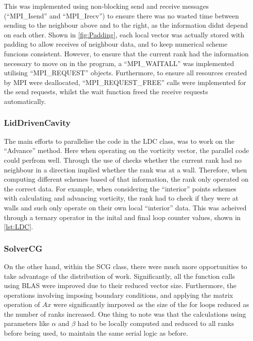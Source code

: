 This was implemented using non-blocking send and receive messages (``MPI\_Isend'' and ``MPI\_Irecv'') to ensure there was no wasted time between sending to the neighbour above and to the right, as the information didnt depend on each other.
Shown in \fig\ref{fig:Padding}, each local vector was actually stored with padding to allow receives of neighbour data, and to keep numerical scheme funcions consistent.
However, to ensure that the current rank had the information necessary to move on in the program, a ``MPI\_WAITALL'' was implemented utilising ``MPI\_REQUEST'' objects.
Furthermore, to ensure all resources created by MPI were deallocated, ``MPI\_REQUEST\_FREE'' calls were implemented for the send requests, whilst the wait function freed the receive requests automatically.
\subsubsection{LidDrivenCavity}
The main efforts to parallelise the code in the LDC class, was to work on the ``Advance'' method. Here when operating on the vorticity vector, the parallel code could perfrom well.
Through the use of checks whether the current rank had no neighbour in a direction implied whether the rank was at a wall. Therefore, when computing different schemes based of that information,
the rank only operated on the correct data. For example, when considering the ``interior'' points schemes with calculating and advancing vorticity, the rank had to check if they were at walls and such only operate on their own local ``interior'' data.
This was acheived through a ternary operator in the inital and final loop counter values, shown in \code\ref{lst:LDC}.
\subsubsection{SolverCG}
On the other hand, within the SCG class, there were much more opportunities to take advantage of the distribution of work.
Significantly, all the function calls using BLAS were improved due to their reduced vector size. Furthermore, the operations involving imposing boundary conditions, and applying the matrix operation of $Ax$ were significantly imrpoved as the size of the for loops reduced as the number of ranks increased.
One thing to note was that the calculations using parameters like $\alpha$ and $\beta$ had to be locally computed and reduced to all ranks before being used, to maintain the same serial logic  as before.
